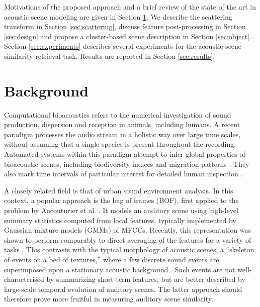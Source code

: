 \documentclass[smallextended]{svjour3}
\begin{document}
Motivations of the proposed approach and a brief review of the state of the art in acoustic scene modeling are given in Section \ref{sec:soa}. We describe the scattering transform in Section \ref{sec:scattering}, discuss feature post-processing in Section \ref{sec:design} and propose a cluster-based scene description in Section \ref{sec:object}. Section \ref{sec:experiments} describes several experiments for the acoustic scene similarity retrieval task. Results are reported in Section \ref{sec:results}.

\section{Background} \label{sec:soa}

Computational bioacoustics refers to the numerical investigation of sound production, dispersion and reception in animals, including humans. A recent paradigm processes the audio stream in a holistic way over large time scales, without assuming that a single species is present throughout the recording. Automated systems within this paradigm attempt to infer global properties of bioacoustic scenes, including biodiversity indices \cite{Bardeli2010} and migration patterns \cite{Obrist2010}. They also mark time intervals of particular interest for detailed human inspection \cite{rosenstock2002landbird}.

A closely related field is that of urban sound environment analysis.
In this context, a popular approach is the bag of frames (BOF), first applied to the problem by Aucouturier et al. \cite{aucouturier2007bag}.
It models an auditory scene using high-level summary statistics computed from local features, typically implemented by Gaussian mixture models (GMMs) of MFCCs.
Recently, this representation was shown to perform comparably to direct averaging of the features for a variety of tasks \cite{lagrange:hal-01082501}.
This contrasts with the typical morphology of acoustic scenes, a ``skeleton of events on a bed of textures,'' where a few discrete sound events are superimposed upon a stationary acoustic background \cite{nelken2013}.
Such events are not well-characterised by summarizing short-term features, but are better described by large-scale temporal evolution of auditory scenes.
The latter approach should therefore prove more fruitful in measuring auditory scene similarity.
\end{document}
